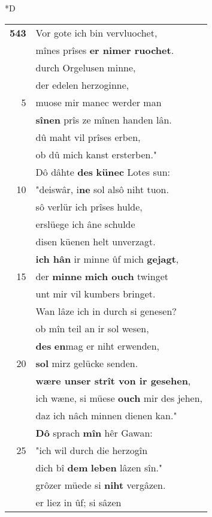 \documentclass[8pt,a4paper,notitlepage]{article}
\begin{document}
\begin{table}[ht]
\begin{minipage}[t]{0.5\linewidth}
\small
\begin{center}*D
\end{center}
\begin{tabular}{rl}
\textbf{543} & Vor gote ich bin vervluochet,\\ 
 & mînes prîses \textbf{er nimer ruochet}.\\ 
 & durch Orgelusen minne,\\ 
 & der edelen herzoginne,\\ 
5 & muose mir manec werder man\\ 
 & \textbf{sînen} prîs ze mînen handen lân.\\ 
 & dû maht vil prîses erben,\\ 
 & ob dû mich kanst ersterben."\\ 
 & Dô dâhte \textbf{des} \textbf{künec} Lotes sun:\\ 
10 & "deiswâr, i\textbf{ne} sol alsô niht tuon.\\ 
 & sô verlür ich prîses hulde,\\ 
 & erslüege ich âne schulde\\ 
 & disen küenen helt unverzagt.\\ 
 & \textbf{ich hân} ir minne ûf mich \textbf{gejagt},\\ 
15 & der \textbf{minne} \textbf{mich ouch} twinget\\ 
 & unt mir vil kumbers bringet.\\ 
 & Wan lâze ich in durch si genesen?\\ 
 & ob mîn teil an ir sol wesen,\\ 
 & \textbf{des} \textbf{en}mag er niht erwenden,\\ 
20 & \textbf{sol} mirz gelücke senden.\\ 
 & \textbf{wære unser strît von ir gesehen},\\ 
 & ich wæne, si müese \textbf{ouch} mir des jehen,\\ 
 & daz ich nâch minnen dienen kan."\\ 
 & \textbf{Dô} sprach \textbf{mîn} hêr Gawan:\\ 
25 & "ich wil durch die herzogîn\\ 
 & dich bî \textbf{dem} \textbf{leben} lâzen sîn."\\ 
 & grôzer müede si \textbf{niht} vergâzen.\\ 
 & er liez in ûf; si sâzen\\ 

\end{tabular}
\end{minipage}
\end{table}
\end{document}
